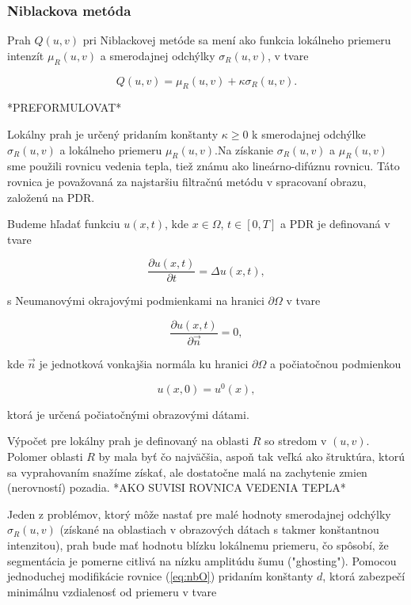\documentclass[a4paper,11pt,twoside]{article}%
\begin{document}
\subsubsection{Niblackova metóda}
Prah $Q(u, v)$ pri Niblackovej metóde sa mení ako funkcia lokálneho priemeru intenzít $\mu_R(u,v)$ a smerodajnej odchýlky $\sigma_R(u,v)$, v tvare

\begin{equation} \label{eq:nbO}
Q(u,v) = \mu_R(u,v) + \kappa\sigma_R(u,v).
\end{equation}

 *PREFORMULOVAT*

Lokálny prah je určený pridaním konštanty $\kappa \geq 0$ k smerodajnej odchýlke $\sigma_R(u,v)$ a lokálneho priemeru $\mu_R(u,v)$.Na získanie $\sigma_R(u,v)$ a $\mu_R(u,v)$ sme použili rovnicu vedenia tepla, tiež známu ako lineárno-difúznu rovnicu. Táto rovnica je považovaná za najstaršiu filtračnú metódu v spracovaní obrazu, založenú na PDR.

Budeme hľadať funkciu $u(x, t)$, kde $x \in \Omega$, $t \in [0, T]$ a PDR je definovaná v tvare

\begin{equation}
\frac{\partial u(x, t)}{\partial t} = \Delta u(x,t),
\end{equation}

s Neumanovými okrajovými podmienkami na hranici $\partial \Omega$ v tvare

\begin{equation}
\frac{\partial u(x, t)}{\partial \vec{n}} = 0,
\end{equation}

kde $\vec{n}$ je jednotková vonkajšia normála ku hranici $\partial \Omega$ a počiatočnou podmienkou 

\begin{equation}
u(x, 0) = u^0(x),
\end{equation}

ktorá je určená počiatočnými obrazovými dátami.

Výpočet pre lokálny prah je definovaný na oblasti $R$ so stredom v $(u, v)$. Polomer oblasti $R$ by mala byť čo najväčšia, aspoň tak veľká ako štruktúra, ktorú sa vyprahovaním snažíme získať, ale dostatočne malá na zachytenie zmien (nerovností) pozadia. *AKO SUVISI ROVNICA VEDENIA TEPLA*

Jeden z problémov, ktorý môže nastať pre malé hodnoty smerodajnej odchýlky $\sigma_R(u,v)$ (získané na oblastiach v obrazových dátach s takmer konštantnou intenzitou), prah bude mať hodnotu blízku lokálnemu priemeru, čo spôsobí, že segmentácia je pomerne citlivá na nízku amplitúdu šumu ("ghosting"). Pomocou jednoduchej modifikácie rovnice (\ref{eq:nbO}) pridaním konštanty $d$, ktorá zabezpečí minimálnu vzdialenosť od priemeru v tvare
\end{document}
